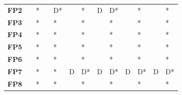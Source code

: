 \begin{table}
\begin{tabularx}{\textwidth}{ c YYYYYYYYYYYY}
        \textbf{FP2}  &                                  & *                                    &                                        & D*                                       &                                       & *                                      & D           & D*         &             & *          &             & *          \\
        \textbf{FP3}  &                                  & *                                    &                                        & *                                        &                                       & *                                      &             & *          &             & *          &             & *          \\
        \textbf{FP4}  &                                  & *                                    &                                        & *                                        &                                       & *                                      &             & *          &             & *          &             & *          \\
        \textbf{FP5}  &                                  & *                                    &                                        & *                                        &                                       & *                                      &             & *          &             & *          &             & *          \\
        \textbf{FP6}  &                                  & *                                    &                                        & *                                        &                                       & *                                      &             & *          &             & *          &             & *          \\
        \textbf{FP7}  &                                  & *                                    &                                        & *                                        & D                                     & D*                                     & D           & D*         & D           & D*         & D           & D*         \\
        \textbf{FP8}  &                                  & *                                    &                                        & *                                        &                                       & *                                      &             & *          &             & *          &             & *          \\

\end{tabularx}
\end{table}
